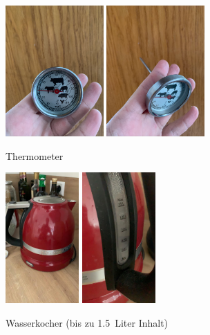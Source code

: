 \documentclass{article}
\begin{document}
\begin{figure}[H]
\includegraphics[height=5cm]{thermometer.jpg}
\includegraphics[height=5cm]{thermometer2.jpg}
\caption{Thermometer}
\end{figure}


\begin{figure}[H]
\includegraphics[height=5cm]{wasserkocher1.jpg}
\includegraphics[height=5cm]{wasserkocher2.jpg}
\caption{Wasserkocher (bis zu 1.5~Liter Inhalt)}
\end{figure}
\end{document}
